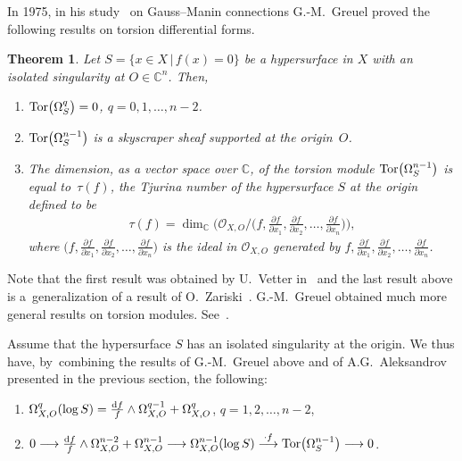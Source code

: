 \documentclass[pdftex]{sigma}%
\numberwithin{equation}{section}
\newtheorem{Theorem}{Theorem}[section]
\begin{document}
In 1975, in his study~\cite{G} on Gauss--Manin connections G.-M.~Greuel proved the following results on torsion differential forms.

\begin{Theorem}
Let $ S = \{ x \in X \,|\, f(x) = 0 \} $ be a hypersurface in $X$
with an isolated singularity at $ O \in {\mathbb C}^n$.
Then,
\begin{enumerate}\itemsep=0pt
\item[$(i)$] $ {\rm Tor}\big(\Omega_S^{q}\big) = 0$, $q=0,1,\ldots,n-2$.

\item[$(ii)$] ${\rm Tor}\big(\Omega_S^{n-1}\big)$ is a skyscraper sheaf supported at the origin~$O$.

\item[$(iii)$] The dimension, as a vector space over ${\mathbb C}$, of the torsion module ${\rm Tor}\big(\Omega_S^{n-1}\big) $ is equal to~$\tau(f)$, the Tjurina number of the hypersurface $S$ at the origin defined to be
\begin{gather*}
 \tau(f) = \dim_{{\mathbb C}}\bigg({\mathcal O}_{X, O}\Big/\bigg(f, \frac{\partial f}{\partial x_1}, \frac{\partial f}{\partial x_2},\ldots,\frac{\partial f}{\partial x_n}\bigg)\bigg),
\end{gather*}
where
$ \big(f, \frac{\partial f}{\partial x_1}, \frac{\partial f}{\partial x_2},\ldots,
\frac{\partial f}{\partial x_n}\big) $
is the ideal in $ {\mathcal O}_{X,O} $ generated by
$f, \frac{\partial f}{\partial x_1}, \frac{\partial f}{\partial x_2}, \ldots, \frac{\partial f}{\partial x_n}$.
\end{enumerate}
\end{Theorem}

Note that the first result was obtained by U.~Vetter in~\cite{V} and the last result above is a~generalization of a result of O.~Zariski~\cite{Z}.
G.-M.~Greuel obtained much more general results on torsion modules. See~\cite[Proposition~1.11, p.~242]{G}.

Assume that the hypersurface $S$ has an isolated singularity at the origin.
We thus have, by~combining the results of G.-M.~Greuel above and of A.G.~Aleksandrov presented in the previous section, the following:
\begin{enumerate}\itemsep=0pt
\item[$(i)$]
$\Omega_{X,O}^{q}(\log S)= \frac{{\rm d}f}{f} \wedge \Omega_{X,O}^{q-1}+\Omega_{X,O}^{q}$, $q=1,2,\ldots, n-2$,

\item[$(ii)$]
$0 \longrightarrow\frac{{\rm d}f}{f} \wedge \Omega_{X,O}^{n-2} + \Omega_{X,O}^{n-1}\longrightarrow
\Omega_{X,O}^{n-1}(\log S) \stackrel{\cdot f}\longrightarrow {\rm Tor}\big(\Omega_{S}^{n-1}\big) \longrightarrow 0$.
\end{enumerate}
\end{document}
